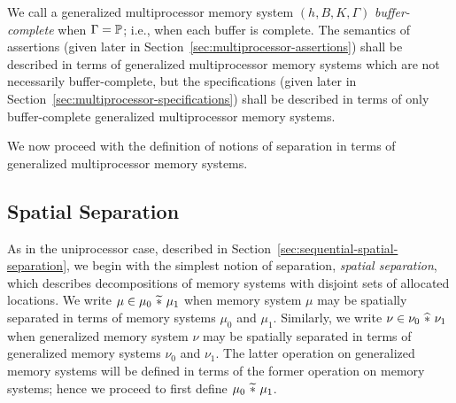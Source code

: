 \documentclass[11pt]{report}
\begin{document}
We call a generalized multiprocessor memory system $(h,B,K,\Gamma)$ \emph{buffer-complete} when $\Gamma = \mathbb{P}$; i.e., when each buffer is complete. The semantics of assertions (given later in Section~\ref{sec:multiprocessor-assertions}) shall be described in terms of generalized multiprocessor memory systems which are not necessarily buffer-complete, but the specifications (given later in Section~\ref{sec:multiprocessor-specifications}) shall be described in terms of only buffer-complete generalized multiprocessor memory systems.

We now proceed with the definition of notions of separation in terms of generalized multiprocessor memory systems. 

\subsection{Spatial Separation}
\label{sec:spatial-separation}

As in the uniprocessor case, described in Section~\ref{sec:sequential-spatial-separation}, we begin with the simplest notion of separation, \emph{spatial separation}, which describes decompositions of memory systems with disjoint sets of allocated locations. We write $\mu \in \mu_0 \operatorname{\,\widetilde{\ast}\,} \mu_1$ when memory system $\mu$ may be spatially separated in terms of memory systems $\mu_0$ and $\mu_1$. Similarly, we write $\nu \in \nu_0 \operatorname{\,\widehat{\ast}\,} \nu_1$ when generalized memory system $\nu$ may be spatially separated in terms of generalized memory systems $\nu_0$ and $\nu_1$. The latter operation on generalized memory systems will be defined in terms of the former operation on memory systems; hence we proceed to first define $\mu_0 \operatorname{\,\widetilde{\ast}\,} \mu_1$. 
\end{document}
